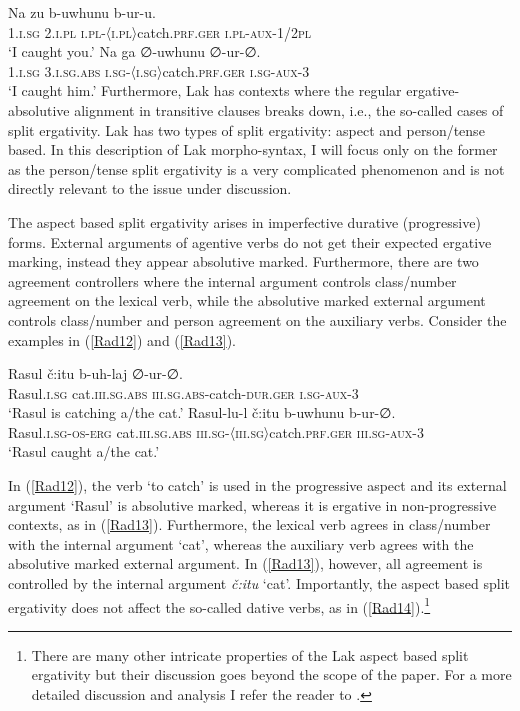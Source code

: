 \documentclass[output=paper]{langscibook}
\begin{document}
\ea\label{Rad10}
\gll Na zu b-uwhunu b-ur-u.\\
\textsc{1.i.sg}  \textsc{2.i.pl} \textsc{i.pl-〈i.pl〉}catch.\textsc{prf.ger} \textsc{i.pl-aux-1/2pl}\\
\glt ‘I caught you.’
\ex\label{Rad11}
\gll Na ga ∅-uwhunu ∅-ur-∅.\\
\textsc{1.i.sg}	\textsc{3.i.sg.abs} \textsc{i.sg-〈i.sg〉}catch.\textsc{prf.ger} \textsc{i.sg-aux-3}\\
\glt ‘I caught him.’
\z
Furthermore, Lak has contexts where the regular ergative-absolutive alignment in transitive clauses breaks down, i.e., the so-called cases of split ergativity. Lak has two types of split ergativity: aspect and person/tense based. In this description of Lak morpho-syntax, I will focus only on the former as the person/tense split ergativity is a very complicated phenomenon and is not directly relevant to the issue under discussion.

The aspect based split ergativity arises in imperfective durative (progressive) forms. External arguments of agentive verbs do not get their expected ergative marking, instead they appear absolutive marked. Furthermore, there are two agreement controllers where the internal argument controls class/number agreement on the lexical verb, while the absolutive marked external argument controls class/number and person agreement on the auxiliary verbs. Consider the examples in (\ref{Rad12}) and (\ref{Rad13}).

\ea\label{Rad12}
\gll Rasul č:itu b-uh-laj ∅-ur-∅.\\
Rasul.\textsc{i.sg} cat.\textsc{iii.sg.abs} \textsc{iii.sg.abs}-catch-\textsc{dur.ger} \textsc{i.sg-aux-3}\\
\glt ‘Rasul is catching a/the cat.’
\ex\label{Rad13}
\gll Rasul-lu-l č:itu b-uwhunu b-ur-∅.\\
Rasul.\textsc{i.sg-os-erg} cat.\textsc{iii.sg.abs} \textsc{iii.sg-〈iii.sg〉}catch.\textsc{prf.ger} \textsc{iii.sg-aux-3}\\
\glt ‘Rasul caught a/the cat.’
\z

In (\ref{Rad12}), the verb ‘to catch’ is used in the progressive aspect and its external argument ‘Rasul’ is absolutive marked, whereas it is ergative in non-progressive contexts, as in (\ref{Rad13}). Furthermore, the lexical verb agrees in class/number with the internal argument ‘cat’, whereas the auxiliary verb agrees with the absolutive marked external argument. In (\ref{Rad13}), however, all agreement is controlled by the internal argument \textit{č:itu} ‘cat’. Importantly, the aspect based split ergativity does not affect the so-called dative verbs, as in (\ref{Rad14}).\footnote{There are many other intricate properties of the Lak aspect based split ergativity but their discussion goes beyond the scope of the paper. For a more detailed discussion and analysis I refer the reader to \citet{GagliardiRadkevich2014}.} 
\end{document}
